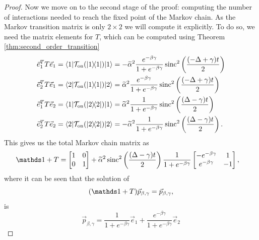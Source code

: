 \begin{proof}
 Now we move on to the second stage of the proof: computing the number of interactions needed to reach the fixed point of the Markov chain. As the Markov transition matrix is only $2 \times 2$ we will compute it explicitly. To do so, we need the matrix elements for $T$, which can be computed using Theorem \ref{thm:second_order_transition} 
\begin{align}
        \vec{e}_1^T T \vec{e}_1 = \langle 1| \mathcal{T}_{\rm on}(| 1\rangle\! \langle 1|) |1\rangle &= - \widetilde{\alpha}^2 \frac{e^{-\beta \gamma}}{1 + e^{-\beta \gamma}} \operatorname{sinc}^2 \left( \frac{(-\Delta + \gamma)t}{2}\right) \label{eq:single_qubit_markov_1}\\
        \vec{e}_2^T T \vec{e}_1 = \langle 2| \mathcal{T}_{\rm on}(| 1\rangle\! \langle 1|) |2\rangle &=  \widetilde{\alpha}^2 \frac{e^{-\beta \gamma}}{1 + e^{-\beta \gamma}} \operatorname{sinc}^2 \left( \frac{(-\Delta + \gamma)t}{2}\right) \\
        \vec{e}_1^T T \vec{e}_2 = \langle 1| \mathcal{T}_{\rm on}(| 2\rangle\! \langle 2|) |1\rangle &=  \widetilde{\alpha}^2 \frac{1}{1 + e^{-\beta \gamma}} \operatorname{sinc}^2 \left( \frac{(\Delta - \gamma)t}{2}\right)\\
        \vec{e}_2^T T \vec{e}_2 = \langle 2| \mathcal{T}_{\rm on}(| 2\rangle\! \langle 2|) |2\rangle &= - \widetilde{\alpha}^2 \frac{1}{1 + e^{-\beta \gamma}} \operatorname{sinc}^2 \left( \frac{(\Delta - \gamma)t}{2}\right). \label{eq:single_qubit_markov_4}
    \end{align}
This gives us the total Markov chain matrix as 
\begin{align}
    \identity + T &= \begin{bmatrix} 1 & 0 \\ 0 & 1 \end{bmatrix} + \widetilde{\alpha}^2 \sinc^2 \left(\frac{(\Delta - \gamma)t}{2} \right) \frac{1}{1 + e^{-\beta \gamma}}\begin{bmatrix} -e^{-\beta \gamma} & 1 \\ e^{-\beta \gamma} & -1\end{bmatrix},\label{eq:markov_matrix_single_qubit_gamma}
\end{align}
 where it can be seen that
 the solution of
 \begin{equation}
     (\identity +T)\vec{p}_{\beta,\gamma} = \vec{p}_{\beta,\gamma},
 \end{equation}
 is
 \begin{equation}
     \vec{p}_{\beta, \gamma} = \frac{1}{1 + e^{-\beta \gamma}} \vec{e}_1 + \frac{e^{-\beta \gamma}}{1 + e^{-\beta \gamma}} \vec{e}_2
 \end{equation}

\end{proof}
